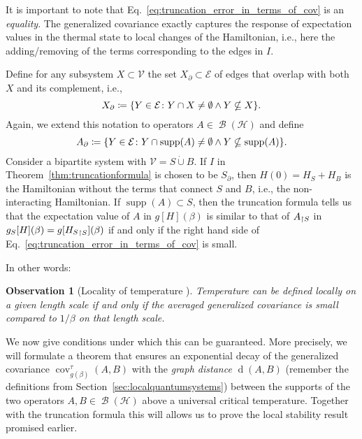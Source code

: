 \documentclass[a4paper,12pt,listof=totoc,index=totoc,bibliography=totoc,headsepline=false,headings=normal,BCOR16.153846mm,DIV12,headinclude,twoside,cleardoublepage=empty,numbers=noenddot,final]{scrreprt}
\theoremstyle{mystyle}
\numberwithin{equation}{section}
\numberwithin{figure}{section}
\numberwithin{lemma}{section}
\numberwithin{theorem}{section}
\numberwithin{corollary}{section}
\numberwithin{definition}{section}
\numberwithin{conjecture}{section}
\newtheorem{observation}{Observation}
\numberwithin{observation}{section}
\newcommand{\+}{\mkern2mu}
\newcommand{\coloneqq}{\mathrel{\vcentcolon\mkern-1.2mu=}} %
\newcommand{\dunion}{\mathbin{\dot{\cup}}}
\newcommand{\texteqref}[1]{Eq.~\eqref{#1}}
\newcommand{\oftype}{\colon}
\renewcommand{\H}{H}
\newcommand{\rhog}{g}
\newcommand{\Vset}{\mathcal{V}}
\newcommand{\Eset}{\mathcal{E}}
\newcommand{\trunc}[2]{{#1}_{\upharpoonright \mathnormal{#2}}}
\DeclareMathOperator{\1}{\mathds{1}}
\DeclareMathOperator{\Bop}{\mathcal{B}}
\DeclareMathOperator{\supp}{supp}
\DeclareMathOperator{\cov}{cov}
\DeclareMathOperator{\dist}{d}
\newcommand{\mc}[1]{\mathcal{#1}}
\newcommand{\mcH}{\mc{H}}
\begin{document}
It is important to note that \texteqref{eq:truncation_error_in_terms_of_cov} is an \emph{equality}.
The generalized covariance exactly captures the response of expectation values in the thermal state to local changes of the Hamiltonian, i.e., here the adding/removing of the terms corresponding to the edges in $I$.

Define for any subsystem $X \subset \Vset$ the set $X_\partial \subset \Eset$ of edges that overlap with both $X$ and its complement, i.e.,
\begin{equation}
  X_\partial \coloneqq \{ Y \in \Eset\oftype Y \cap X \neq \emptyset \land Y \nsubseteq X \} .
\end{equation}
Again, we extend this notation to operators $A \in \Bop(\mcH)$ and define
\begin{equation}
  A_\partial \coloneqq \{ Y \in \Eset\oftype Y \cap \supp(A) \neq \emptyset \land Y \nsubseteq \supp(A) \} .
\end{equation}
Consider a bipartite system with $\Vset = S \dunion B$.
If $I$ in Theorem~\ref{thm:truncationformula} is chosen to be $S_\partial$, then $\H(0) = \H_S + \H_B$ is the Hamiltonian without the terms that connect $S$ and $B$, i.e., the non-interacting Hamiltonian.
If $\supp(A) \subset S$, then the truncation formula tells us that the expectation value of $A$ in $\rhog[\H](\beta)$ is similar to that of $\trunc A S$ in $\rhog_S[\H](\beta) = \rhog[\trunc{\H_S} S](\beta)$ if and only if the right hand side of \texteqref{eq:truncation_error_in_terms_of_cov} is small.

In other words:
\begin{observation}[Locality of temperature \cite{Kliesch2013a}]
  Temperature can be defined locally on a given length scale if and only if the averaged generalized covariance is small compared to $1/\beta$ on that length scale.
\end{observation}

We now give conditions under which this can be guaranteed.
More precisely, we will formulate a theorem that ensures an exponential decay of the generalized covariance $\cov^\tau_{\rhog(\beta)}(A,B)$ with the \emph{graph distance} $\dist(A,B)$ (remember the definitions from Section~\ref{sec:localquantumsystems}) between the supports of the two operators $A,B \in \Bop(\mcH)$ above a universal critical temperature.
Together with the truncation formula this will allows us to prove the local stability result promised earlier.
\end{document}
